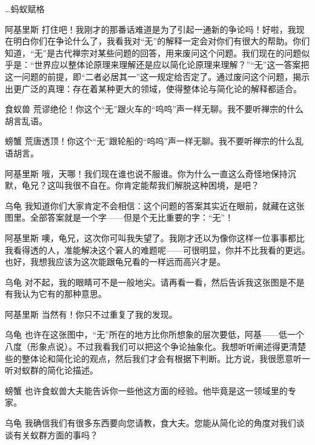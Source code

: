 \begin{dialog}{…蚂蚁赋格}
\begin{dialogue}
\item[阿基里斯]打住吧！我刚才的那番话难道是为了引起一通新的争论吗！好啦，我现在明白你们在争论什么了，我看我对“无”的解释一定会对你们有很大的帮助。你们知道，“无”是古代禅宗对某些问题的回答，用来废问这个问题。我们现在的问题似乎是：“世界应以整体论原理来理解还是应以简化论原理来理解？”“无”这一答案把这一问题的前提，即“二者必居其一”这一规定给否定了。通过废问这个问题，揭示出更广泛的真理：存在着某种更大的领域，使得整体论与简化论的解释都适合。

\item[食蚁兽]荒谬绝伦！你这个“无”跟火车的“呜呜”声一样无聊。我不要听禅宗的什么胡言乱语。

\item[螃蟹]荒唐透顶！你这个“无”跟轮船的“呜呜”声一样无聊。我不要听禅宗的什么乱语胡言。

\item[阿基里斯]哦，天哪！我们现在谁也说不服谁。你为什么一直这么奇怪地保持沉默，龟兄？这叫我很不自在。你肯定能帮我们解脱这种困境，是吧？

\item[乌龟]我知道你们大家肯定不会相信：这个问题的答案其实近在眼前，就藏在这张图里。全部答案就是一个字——但是个无比重要的字：“无”！


\item[阿基里斯]噢，龟兄，这次你可叫我失望了。我刚才还以为像你这样一位事事都比我看得透的人，准能解决这个窘人的难题呢——可很明显，你并不比我看的更远。也好，我想我应该为这次能跟龟兄看的一样远而高兴才是。

\item[乌龟]对不起，我的眼睛可不是一般地尖。请再看一看，然后告诉我这张图是不是有我认为它有的那种意思。

\item[阿基里斯]当然有！你只不过重复了我的发现。

\item[乌龟]也许在这张图中，“无”所在的地方比你所想象的层次要低，阿基——低一个八度（形象点说）。不过我看我们可以把这个争论抽象化。我想听听阐述得更清楚些的整体论和简化论的观点，然后我们才会有根据下判断。比方说，我很愿意听一听对蚁群的简化论描述。

\item[螃蟹]也许食蚁兽大夫能告诉你一些他这方面的经验。他毕竟是这一领域里的专家。

\item[乌龟]我确信我们有很多东西要向您请教，食大夫。您能从简化论的角度对我们谈谈有关蚁群方面的事吗？


\end{dialogue}
\end{dialog}
